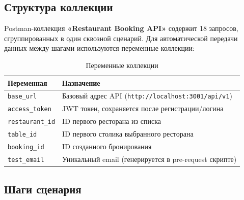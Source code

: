 \documentclass[a4paper,14pt]{extarticle}
\begin{document}
\subsection{Структура коллекции}

Postman-коллекция \textbf{«Restaurant Booking API»} содержит 18 запросов,
сгруппированных в один сквозной сценарий. Для автоматической передачи данных между
шагами используются переменные коллекции:

\begin{table}[H]
\centering
\caption{Переменные коллекции}
\begin{tabularx}{\textwidth}{lX}
\toprule
\textbf{Переменная} & \textbf{Назначение} \\
\midrule
\texttt{base\_url}      & Базовый адрес API (\texttt{http://localhost:3001/api/v1}) \\
\texttt{access\_token}  & JWT токен, сохраняется после регистрации/логина \\
\texttt{restaurant\_id} & ID первого ресторана из списка \\
\texttt{table\_id}      & ID первого столика выбранного ресторана \\
\texttt{booking\_id}    & ID созданного бронирования \\
\texttt{test\_email}    & Уникальный email (генерируется в pre-request скрипте) \\
\bottomrule
\end{tabularx}
\end{table}

\subsection{Шаги сценария}
\end{document}
